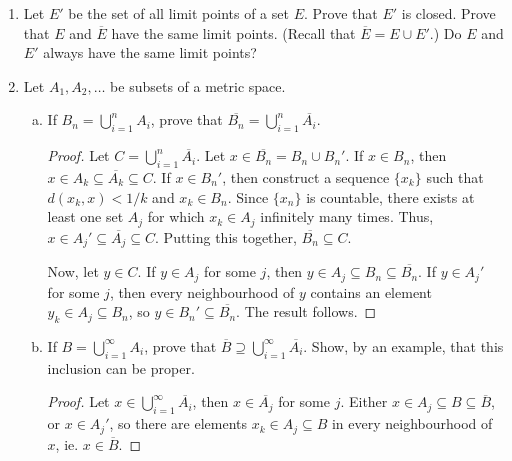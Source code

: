 \documentclass{scrbook}
\begin{document}
\begin{enumerate}
\begin{proof}
Let $y \not\in \{0, 1, 2\}$. Consider $k \in \{0, 1, 2\}$. If $y < k$ or $y > k + 1$, then taking some radius smaller than the distance to $[k, k + 1]$ fails. Otherwise, we have $y - k \in [1/(n+1), 1/(n-1)]$ for some $n$. Taking a radius smaller than the distance to the nearest of the three points $k + 1/(n+1), k + 1/n, k + 1/(n-1)$ fails.
\end{proof}

\item %
Let $E'$ be the set of all limit points of a set $E$. Prove that $E'$ is closed. Prove that $E$ and $\overline{E}$ have the same limit points. (Recall that $\overline{E} = E \cup E'$.) Do $E$ and $E'$ always have the same limit points?

\item %
Let $A_1, A_2, \dotsc$ be subsets of a metric space.
\begin{enumerate}[(a)]
\item If $B_n = \bigcup_{i=1}^{n} A_i$, prove that $\overline{B_n} = \bigcup_{i=1}^{n} \overline{A_i}$. 

\begin{proof}
Let $C = \bigcup_{i=1}^{n} \overline{A_i}$. Let $x \in \overline{B_n} = B_n \cup B_n'$. If $x \in B_n$, then $x \in A_k \subseteq \overline{A_k} \subseteq C$. If $x \in B_n'$, then construct a sequence $\{x_k\}$ such that $d(x_k, x) < 1/k$ and $x_k \in B_n$. Since $\{x_n\}$ is countable, there exists at least one set $A_j$ for which $x_k \in A_j$ infinitely many times. Thus, $x \in A_j' \subseteq \overline{A_j} \subseteq C$. Putting this together, $\overline{B_n} \subseteq C$.

Now, let $y \in C$. If $y \in A_j$ for some $j$, then $y \in A_j \subseteq B_n \subseteq \overline{B_n}$. If $y \in A_j'$ for some $j$, then every neighbourhood of $y$ contains an element $y_k \in A_j \subseteq B_n$, so $y \in B_n' \subseteq \overline{B_n}$. The result follows.
\end{proof}

\item If $B = \bigcup_{i=1}^{\infty} A_i$, prove that $\overline{B} \supseteq \bigcup_{i=1}^{\infty} \overline{A_i}$. Show, by an example, that this inclusion can be proper.
\begin{proof}
Let $x \in \bigcup_{i=1}^{\infty} \overline{A_i}$, then $x \in \overline{A_j}$ for some $j$. Either $x \in A_j \subseteq B \subseteq \overline{B}$, or $x \in A_j'$, so there are elements $x_k \in A_j \subseteq B$ in every neighbourhood of $x$, ie. $x \in \overline{B}$.


\end{proof}
\end{enumerate}
\end{enumerate}
\end{document}
